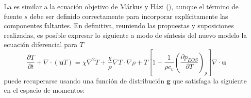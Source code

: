 La  es similar a la ecuaci\'on objetivo de M\'arkus y H\'azi (), aunque el t\'ermino de fuente $s$ debe ser definido correctamente para incorporar expl\'icitamente las componentes faltantes. En definitiva, reuniendo las propuestas y suposiciones realizadas, es posible expresar lo siguiente a modo de s\'intesis del nuevo modelo \cite{fogliatto_assessment_2021} la ecuaci\'on diferencial para $T$
\begin{equation}
	\dfrac{\partial T}{\partial t} + \nabla \cdot (\bm{u} T) = \chi \nabla^2 T  + \dfrac{\chi}{\rho} \nabla T \cdot \nabla \rho + T \left[ 1 - \dfrac{1}{\rho c_v} \left( \dfrac{\partial p_{EOS}}{\partial T} \right)_{\rho} \right] \nabla \cdot \bm{u}
\end{equation}
puede recuperarse usando una funci\'on de distribuci\'on $\bm{g}$ que satisfaga la siguiente \lbe{} en el espacio de momentos:
